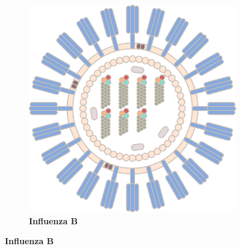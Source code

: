 \begin{figure}
\begin{adjustbox}{minipage=\dimexpr{}\fboxrule,fbox}
\begin{subfigure}[b]{0.45\textwidth}
            \includegraphics[width=\textwidth]{Extra_Graphics/Influenza_B.pdf}
            \caption[Influenza B]{\textbf{Influenza B}}
            \label{fig:1.0.1b}
        \end{subfigure}
    \end{adjustbox}
\end{figure}

